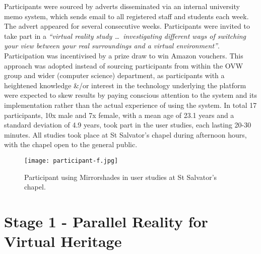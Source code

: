 Participants were sourced by adverts disseminated via an internal university memo system, which sends email to all registered staff and students each week. The advert appeared for several consecutive weeks. Participants were invited to take part in a \textit{``virtual reality study \ldots\ investigating different ways of switching your view between your real surroundings and a virtual environment''}. Participation was incentivised by a prize draw to win Amazon vouchers. This approach was adopted instead of sourcing participants from within the OVW group and wider (computer science) department, as participants with a heightened knowledge \&/or interest in the technology underlying the platform were expected to skew results by paying conscious attention to the system and its implementation rather than the actual experience of using the system. In total 17 participants, 10x male and 7x female, with a mean age of 23.1 years and a standard deviation of 4.9 years, took part in the user studies, each lasting 20-30 minutes. All studies took place at St Salvator's chapel during afternoon hours, with the chapel open to the general public.

\begin{figure}
	\begin{center}
		\texttt{[image: participant-f.jpg]}
		\caption{Participant using Mirrorshades in user studies at St Salvator's chapel.}
		\label{participant-f.jpg}
	\end{center}
\end{figure}


\section{Stage 1 - Parallel Reality for Virtual Heritage}

